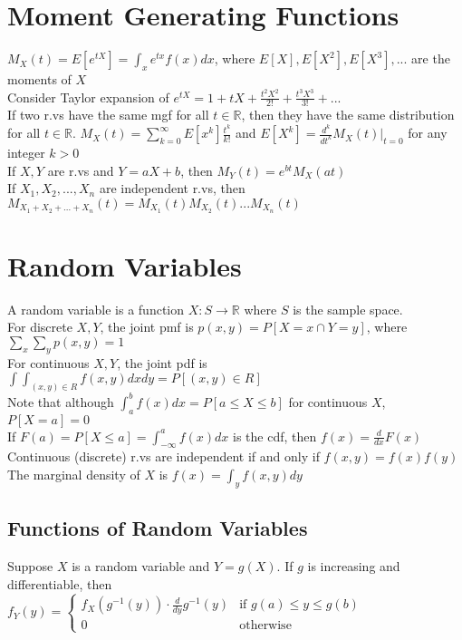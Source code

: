 \documentclass{article}
\begin{document}
\section{Moment Generating Functions}
$M_X(t) = E[e^{tX}] = \int_x e^{tx}f(x)dx$, where $E[X], E[X^2], E[X^3], ...$ are the moments of $X$ \\
Consider Taylor expansion of $e^{tX} = 1 + tX + \frac{t^2X^2}{2!} + \frac{t^3X^3}{3!} + ... $ \\
If two r.vs have the same mgf for all $t \in \mathbb{R}$, then they have the same distribution for all $t \in \mathbb{R}$.
$M_X(t) = \sum_{k=0}^{\infty}E[x^k]\frac{t^k}{k!}$ and $E[X^k] = \frac{d^k}{dt^k}M_X(t) \big |_{t=0}$ for any integer $k > 0$ \\
If $X, Y$ are r.vs and $Y = aX + b$, then $M_Y(t) = e^{bt}M_X(at)$ \\
If $X_1, X_2, ..., X_n$ are independent r.vs, then $M_{X_1 + X_2 + ... + X_n}(t) = M_{X_1}(t)M_{X_2}(t) ... M_{X_n}(t)$

\section{Random Variables}
A random variable is a function $X: S \to \mathbb{R}$ where $S$ is the sample space.\\
For discrete $X, Y$, the joint pmf is $p(x,y) = P[X = x \cap Y = y]$, where $\sum_x \sum_y p(x, y)=1$\\
For continuous $X, Y$, the joint pdf is $\int \int_{(x,y) \in R} f(x, y)dx dy = P[(x, y) \in R]$ \\
Note that although $\int_a^b f(x)dx = P[a \leq X \leq b]$ for continuous $X$, $P[X=a] = 0$ \\
If $F(a) = P[X\leq a] = \int_{-\infty}^a f(x)dx$ is the cdf, then $f(x) = \frac{d}{dx}F(x)$ \\
Continuous (discrete) r.vs are independent if and only if $f(x,y) = f(x) f(y) $ \\
The marginal density of $X$ is $f(x) = \int_y f(x,y)dy$ 

\subsection{Functions of Random Variables}
Suppose $X$ is a random variable and $Y=g(X)$. If $g$ is increasing and differentiable, then \\
$f_Y(y) = \begin{cases} f_X(g^{-1}(y)) \cdot \frac{d}{dy}g^{-1}(y) & \text{if } g(a) \leq y \leq g(b) \\ 
0 & \text{otherwise} \end{cases}$
\end{document}
